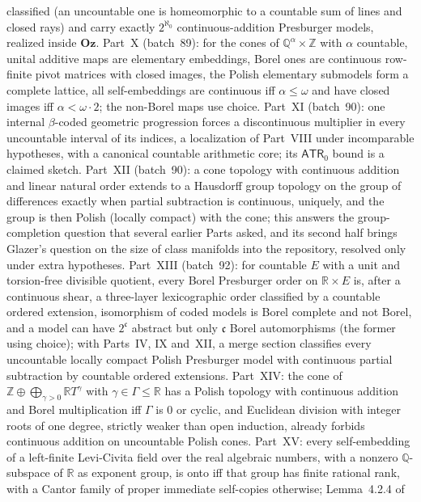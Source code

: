 \documentclass[11pt]{article}
\newcommand{\Q}{\mathbb{Q}}
\newcommand{\R}{\mathbb{R}}
\newcommand{\Oz}{\mathbf{Oz}}
\newcommand{\Z}{\mathbb{Z}}
\begin{document}
{classified (an uncountable one is homeomorphic to a countable sum of lines
and closed rays) and carry exactly $2^{\aleph_0}$ continuous-addition
Presburger models, realized inside $\Oz$.  Part~X (batch~89): for the cones
of $\Q^\alpha\times\Z$ with $\alpha$ countable, unital additive maps are
elementary embeddings, Borel ones are continuous row-finite pivot matrices
with closed images, the Polish elementary submodels form a complete
lattice, all self-embeddings are continuous iff $\alpha\le\omega$ and have
closed images iff $\alpha<\omega\cdot2$; the non-Borel maps use choice.
Part~XI (batch~90): one internal $\beta$-coded geometric progression forces
a discontinuous multiplier in every uncountable interval of its indices, a
localization of Part~VIII under incomparable hypotheses, with a canonical
countable arithmetic core; its $\mathsf{ATR}_0$ bound is a claimed sketch.
Part~XII (batch~90): a cone topology with continuous addition and linear
natural order extends to a Hausdorff group topology on the group of
differences exactly when partial subtraction is continuous, uniquely, and
the group is then Polish (locally compact) with the cone; this answers the
group-completion question that several earlier Parts asked, and its second
half brings Glazer's question on the size of class manifolds into the
repository, resolved only under extra hypotheses.  Part~XIII (batch~92):
for countable $E$ with a unit and torsion-free divisible quotient, every
Borel Presburger order on $\R\times E$ is, after a continuous shear,
a three-layer lexicographic order classified by a countable ordered
extension, isomorphism of coded models is Borel complete and not Borel, and
a model can have $2^{\mathfrak c}$ abstract but only $\mathfrak c$ Borel
automorphisms (the former using choice); with Parts~IV, IX and~XII, a merge
section classifies every uncountable locally compact Polish Presburger
model with continuous partial subtraction by countable ordered extensions.
Part~XIV: the cone of $\Z\oplus\bigoplus_{\gamma>0}\R T^\gamma$ with
$\gamma\in\Gamma\le\R$ has a Polish topology with continuous addition and
Borel multiplication iff $\Gamma$ is $0$ or cyclic, and Euclidean division
with integer roots of one degree, strictly weaker than open induction, already
forbids continuous addition on uncountable Polish cones.  Part~XV: every
self-embedding of a left-finite Levi-Civita field over the real algebraic
numbers, with a nonzero $\Q$-subspace of $\R$ as exponent group, is onto
iff that group has finite rational rank, with a
Cantor family of proper immediate self-copies otherwise; Lemma~4.2.4 of
}
\end{document}
